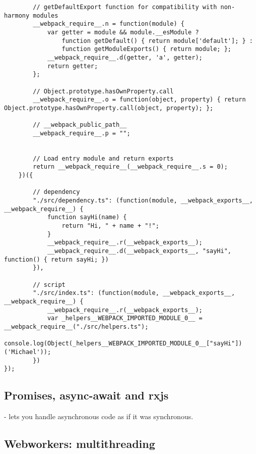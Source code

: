 \begin{lstlisting}
        // getDefaultExport function for compatibility with non-harmony modules
        __webpack_require__.n = function(module) {
            var getter = module && module.__esModule ?
                function getDefault() { return module['default']; } :
                function getModuleExports() { return module; };
            __webpack_require__.d(getter, 'a', getter);
            return getter;
        };
    
        // Object.prototype.hasOwnProperty.call
        __webpack_require__.o = function(object, property) { return Object.prototype.hasOwnProperty.call(object, property); };
    
        // __webpack_public_path__
        __webpack_require__.p = "";
    
    
        // Load entry module and return exports
        return __webpack_require__(__webpack_require__.s = 0);
    })({
    
        // dependency
        "./src/dependency.ts": (function(module, __webpack_exports__, __webpack_require__) {
            function sayHi(name) {
                return "Hi, " + name + "!";
            }
            __webpack_require__.r(__webpack_exports__);
            __webpack_require__.d(__webpack_exports__, "sayHi", function() { return sayHi; })
        }),
    
        // script 
        "./src/index.ts": (function(module, __webpack_exports__, __webpack_require__) {
            __webpack_require__.r(__webpack_exports__);
            var _helpers__WEBPACK_IMPORTED_MODULE_0__ = __webpack_require__("./src/helpers.ts");
            console.log(Object(_helpers__WEBPACK_IMPORTED_MODULE_0__["sayHi"])('Michael'));
        })
});
\end{lstlisting}


\subsection{Promises, async-await and rxjs}
 -  lets you handle asynchronous code as if it was synchronous. 

\subsection{Webworkers: multithreading}


